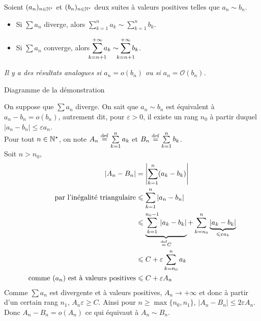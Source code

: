 \begin{prop}{}
    Soient $(a_n)_{n \in \mathbb{N}^\star}$ et $(b_n)_{n \in \mathbb{N}^\star}$ deux suites à valeurs positives telles que $a_n \sim b_n$.
    \begin{itemize}
        \item Si $ \sum a_n$ diverge, alors $\sum\limits_{k=1}^{n} a_k \sim \sum\limits_{k=1}^{n} b_k$. 
        \item Si $ \sum a_n$ converge, alors $\smashoperator{\sum\limits_{k=n+1}^{+ \infty}} a_k \sim \smashoperator{\sum\limits_{k=n+1}^{+ \infty}} b_k$. 
    \end{itemize}
\end{prop}

\emph{Il y a des résultats analogues si $a_n = o(b_n)$ ou si $a_n = \mathcal{O}(b_n)$.}

\begin{marginfigure}[3cm]
    \centering
    \caption*{\centering Diagramme de la démonstration}
\end{marginfigure}

\begin{preuve}
    On suppose que $\sum a_n$ diverge. On sait que $a_n \sim b_n$ est équivalent à $a_n -b_n = o(b_n)$, autrement dit, pour $\varepsilon > 0$, il existe un rang $n_0$ à partir duquel $|a_n -b_n| \leqslant \varepsilon a_n$. \\
    Pour tout $n \in \mathbb{N}^\star$, on note $A_n \overset{\mathrm{\tiny def}}{=} \sum\limits_{k=1}^n a_k$ et $B_n \overset{\mathrm{\tiny def}}{=} \sum\limits_{k=1}^n b_k$. \\
    Soit $n > n_0$,
    \begin{align*}
        |A_n - B_n| &= \left|\sum_{k=1}^n (a_k - b_k) \right| \\
        \text{par l'inégalité triangulaire} &\leqslant \sum_{k=1}^n |a_n-b_n| \\
        &\leqslant \underbrace{\sum_{k=1}^{n_0-1} |a_k - b_k|}_{\overset{\mathrm{\tiny def}}{=} C} + \sum_{k=n_0}^n \underbrace{|a_k - b_k|}_{\leqslant \varepsilon a_k} \\
        &\leqslant C + \varepsilon \sum_{k=n_0}^n a_k \\
        \text{comme $(a_n)$ est à valeurs positives} &\leqslant C + \varepsilon A_n
    \end{align*}
    Comme $\sum a_n$ est divergente et à valeurs positives, $A_n \longrightarrow +\infty$ et donc à partir d'un certain rang $n_1$, $A_n \varepsilon \geqslant C$. Ainsi pour $n \geqslant \max \{ n_0, n_1 \}$, $|A_n - B_n| \leqslant 2 \varepsilon A_n$. \\ 
    Donc $A_n - B_n = o(A_n)$ ce qui équivaut à $A_n \sim B_n$.
\end{preuve}
